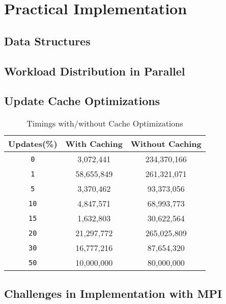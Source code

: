 \section{Practical Implementation} \label{Sec: Practical Implementation}
\blindtext
\subsection{Data Structures}\label{Subsec: Data Structures}
\blindtext
\subsection{Workload Distribution in Parallel}\label{Subsec: Workload Distribution in Parallel}
\blindtext
\subsection{Update Cache Optimizations}\label{Subsec: Cache Optimizations}
\blindtext
\begin{table}[H]
    \centering
    \caption{Timings with/without Cache Optimizations}
    \begin{tabular}{|c|c|c|}
        \hline
        \textbf{Updates(\%)} & \textbf{With Caching} & \textbf{Without Caching} \\
        \hline
        \texttt{0} & 3,072,441 & 234,370,166 \\
        \texttt{1} & 58,655,849 & 261,321,071 \\
        \texttt{5} & 3,370,462 & 93,373,056 \\
        \texttt{10} & 4,847,571 & 68,993,773 \\
        \texttt{15} & 1,632,803 & 30,622,564 \\
        \texttt{20} & 21,297,772 & 265,025,809 \\
        \texttt{30} & 16,777,216 & 87,654,320 \\
        \texttt{50} & 10,000,000 & 80,000,000 \\
        \hline
    \end{tabular}
    \label{tab:cache_optimizations}
\end{table}

\subsection{Challenges in Implementation with MPI}\label{Subsec: Challenges in Implementation with MPI}
\blindtext


